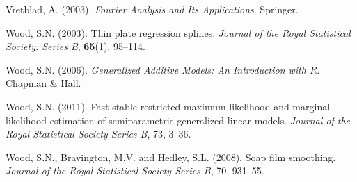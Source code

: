 \documentclass[useAMS,referee, usegraphicx]{biom}
\begin{document}
\begin{thebibliography}{99}
\bibitem{} Vretblad, A. (2003). \textit{Fourier Analysis and Its Applications}. Springer.

\bibitem{} Wood, S.N. (2003). Thin plate regression splines. \textit{Journal of the Royal Statistical Society: Series B}, \textbf{65}(1), 95--114.

\bibitem{} Wood, S.N. (2006). \textit{Generalized Additive Models: An Introduction with R}. Chapman \& Hall.

\bibitem{} Wood, S.N. (2011). Fast stable restricted maximum likelihood and marginal likelihood estimation of semiparametric generalized linear models. \textit{Journal of the Royal Statistical Society Series B}, 73, 3--36.

\bibitem{} Wood, S.N., Bravington, M.V. and Hedley, S.L. (2008). Soap film smoothing. \textit{Journal of the Royal Statistical Society Series B}, 70, 931--55.

\end{thebibliography}


\label{lastpage}
\end{document}
